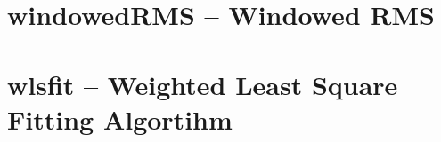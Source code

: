 \documentclass[12pt,a4paper,oneside]{report} %
\begin{document}
\chapter{windowedRMS -- Windowed RMS} %
\stopcontents[maintoc]
\section*{\infosection} %

\section*{\examplesection} %

\resumecontents[maintoc]

\chapter{wlsfit -- Weighted Least Square Fitting Algortihm} %
\stopcontents[maintoc]
\section*{\infosection} %

\section*{\examplesection} %

\resumecontents[maintoc]
\end{document}
